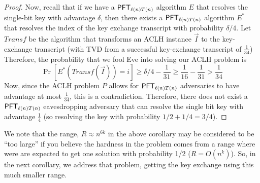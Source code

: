 \begin{proof}
	Now, recall that if we have a $\mathsf{PFT}_{\ell(n)T(n)}$ algorithm $E$ that resolves the single-bit key with advantage $\delta$, then there exists a $\mathsf{PFT}_{\ell(n) T(n)}$ algorithm $E^*$ that resolves the index of the key exchange transcript with probability $\delta/4$. Let $Transf$ be the algorithm that transforms an ACLH instance $\vec I$ to the key-exchange transcript (with TVD from a successful key-exchange transcript of $\frac 1 {34}$) Therefore, the probability that we fool Eve into solving our ACLH problem is
	\[ \Pr[ E^*(Transf(\vec I)) = i ] \ge \delta/4 - \frac 1{31} \ge \frac{1}{16} - \frac 1 {31} > \frac 1 {34} \]
	Now, since the ACLH problem $P$ allows for $\mathsf{PFT}_{\ell(n)T(n)}$ adversaries to have advantage at most $\frac 1 {34}$, this is a contradiction. Therefore, there does not exist a $\mathsf{PFT}_{\ell(n)T(n)}$ eavesdropping adversary that can resolve the single bit key with advantage $\frac 1 4$ (so resolving the key with probability $1/2 + 1/4 = 3/4$).
\end{proof}
We note that the range, $R \approx n^{6k}$ in the above corollary may be considered to be ``too large'' if you believe the hardness in the problem comes from a range where were are expected to get one solution with probability 1/2 ($R = O(n^k)$). So, in the next corollary, we address that problem, getting the key exchange using this much smaller range.
%	
%	

